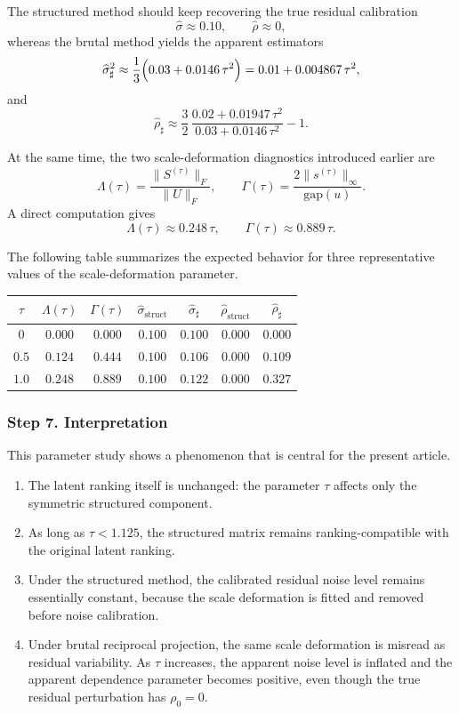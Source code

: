 \documentclass[11pt]{amsart}
\theoremstyle{definition}
\theoremstyle{plain}
\numberwithin{equation}{section}
\begin{document}
The structured method should keep recovering the true residual calibration
\[
\widehat\sigma\approx 0.10,
\qquad
\widehat\rho\approx 0,
\]
whereas the brutal method yields the apparent estimators
\[
\widehat\sigma_\sharp^2
\approx
\frac13\Bigl(0.03+0.0146\,\tau^2\Bigr)
=
0.01+0.004867\,\tau^2,
\]
and
\[
\widehat\rho_\sharp
\approx
\frac32\,
\frac{0.02+0.01947\,\tau^2}{0.03+0.0146\,\tau^2}
-1.
\]

At the same time, the two scale-deformation diagnostics introduced earlier are
\[
\Lambda(\tau)=\frac{\|S^{(\tau)}\|_F}{\|U\|_F},
\qquad
\Gamma(\tau)=\frac{2\|s^{(\tau)}\|_\infty}{\mathrm{gap}(u)}.
\]
A direct computation gives
\[
\Lambda(\tau)\approx 0.248\,\tau,
\qquad
\Gamma(\tau)\approx 0.889\,\tau.
\]

The following table summarizes the expected behavior for three representative values of the scale-deformation parameter.

\begin{center}
\begin{tabular}{c|cc|cc|cc}
\hline
$\tau$ & $\Lambda(\tau)$ & $\Gamma(\tau)$
& $\widehat\sigma_{\mathrm{struct}}$
& $\widehat\sigma_{\sharp}$
& $\widehat\rho_{\mathrm{struct}}$
& $\widehat\rho_{\sharp}$\\
\hline
$0$   & $0.000$ & $0.000$ & $0.100$ & $0.100$ & $0.000$ & $0.000$\\
$0.5$ & $0.124$ & $0.444$ & $0.100$ & $0.106$ & $0.000$ & $0.109$\\
$1.0$ & $0.248$ & $0.889$ & $0.100$ & $0.122$ & $0.000$ & $0.327$\\
\hline
\end{tabular}
\end{center}

\subsubsection*{Step 7. Interpretation}

This parameter study shows a phenomenon that is central for the present article.

\begin{enumerate}
\item The latent ranking itself is unchanged: the parameter $\tau$ affects only the symmetric structured component.
\item As long as $\tau<1.125$, the structured matrix remains ranking-compatible with the original latent ranking.
\item Under the structured method, the calibrated residual noise level remains essentially constant, because the scale deformation is fitted and removed before noise calibration.
\item Under brutal reciprocal projection, the same scale deformation is misread as residual variability. As $\tau$ increases, the apparent noise level is inflated and the apparent dependence parameter becomes positive, even though the true residual perturbation has $\rho_0=0$.
\end{enumerate}
\end{document}
